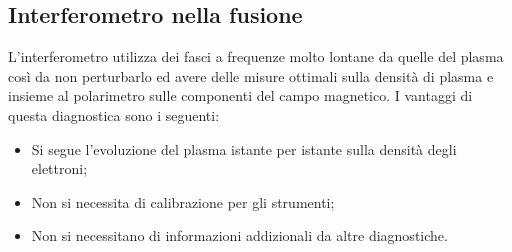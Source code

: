 \documentclass{article}
\begin{document}
\subsection{Interferometro nella fusione}
L'interferometro utilizza dei fasci a frequenze molto lontane da quelle del plasma così da non perturbarlo ed avere delle misure ottimali sulla densità di plasma e insieme al polarimetro sulle componenti del campo magnetico.\newline
I vantaggi di questa diagnostica sono i seguenti:\begin{itemize}
	\item Si segue l'evoluzione del plasma istante per istante sulla densità degli elettroni;
	\item Non si necessita di calibrazione per gli strumenti;
	\item Non si necessitano di informazioni addizionali da altre diagnostiche.
\end{itemize}
\end{document}
